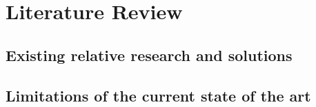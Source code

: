 \section{Literature Review}
\subsection{Existing relative research and solutions}

\subsection{Limitations of the current state of the art}